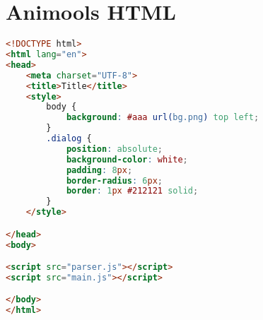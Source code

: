 \section{Animools HTML}
\begin{lstlisting}[language=HTML,label={app:animools:html}, caption={HTML page that loads the Animools parser and engine}]
<!DOCTYPE html>
<html lang="en">
<head>
    <meta charset="UTF-8">
    <title>Title</title>
    <style>
        body {
            background: #aaa url(bg.png) top left;
        }
        .dialog {
            position: absolute;
            background-color: white;
            padding: 8px;
            border-radius: 6px;
            border: 1px #212121 solid;
        }
    </style>

</head>
<body>

<script src="parser.js"></script>
<script src="main.js"></script>

</body>
</html>
\end{lstlisting}